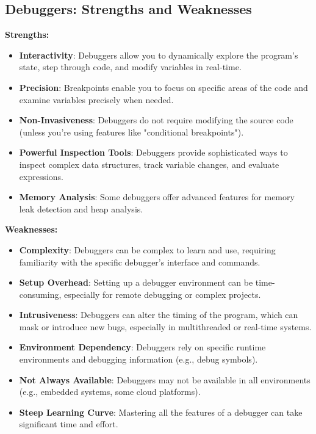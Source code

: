 \documentclass{article}
\begin{document}
\subsection*{Debuggers: Strengths and Weaknesses}

\textbf{Strengths:}

\begin{itemize}
    \item \textbf{Interactivity}: Debuggers allow you to dynamically explore the program's state, step through code, and modify variables in real-time.
    \item \textbf{Precision}: Breakpoints enable you to focus on specific areas of the code and examine variables precisely when needed.
    \item \textbf{Non-Invasiveness}: Debuggers do not require modifying the source code (unless you're using features like "conditional breakpoints").
    \item \textbf{Powerful Inspection Tools}: Debuggers provide sophisticated ways to inspect complex data structures, track variable changes, and evaluate expressions.
    \item \textbf{Memory Analysis}: Some debuggers offer advanced features for memory leak detection and heap analysis.
\end{itemize}

\textbf{Weaknesses:}

\begin{itemize}
    \item \textbf{Complexity}: Debuggers can be complex to learn and use, requiring familiarity with the specific debugger's interface and commands.
    \item \textbf{Setup Overhead}: Setting up a debugger environment can be time-consuming, especially for remote debugging or complex projects.
    \item \textbf{Intrusiveness}: Debuggers can alter the timing of the program, which can mask or introduce new bugs, especially in multithreaded or real-time systems.
    \item \textbf{Environment Dependency}: Debuggers rely on specific runtime environments and debugging information (e.g., debug symbols).
    \item \textbf{Not Always Available}: Debuggers may not be available in all environments (e.g., embedded systems, some cloud platforms).
    \item \textbf{Steep Learning Curve}: Mastering all the features of a debugger can take significant time and effort.
\end{itemize}
\end{document}
